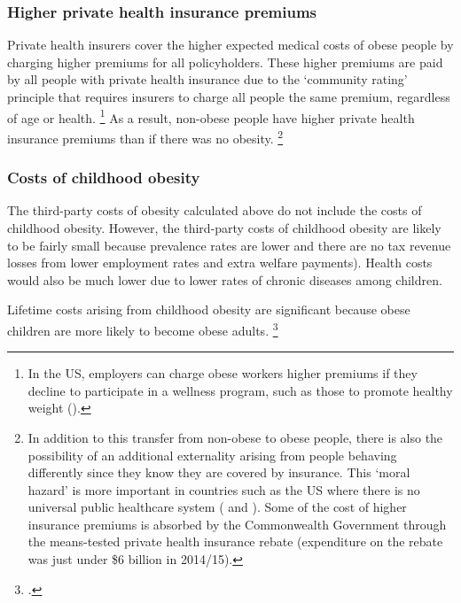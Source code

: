 \documentclass[embargoed]{grattan}
\begin{document}
\subsubsection{Higher private health insurance premiums}\label{higher-private-health-insurance-premiums}

Private health insurers cover the higher expected medical costs of obese people by charging higher premiums for all policyholders.
These higher premiums are paid by all people with private health insurance due to the `community rating' principle that requires insurers to charge all people the same premium, regardless of age or health.%
\footnote{In the US, employers can charge obese workers higher premiums if they decline to participate in a wellness program, such as those to promote healthy weight (\textcite{Karnani2016ObesityCrisisas}).} As a result, non-obese people have higher private health insurance premiums than if there was no obesity.%
\footnote{In addition to this transfer from non-obese to obese people, there is also the possibility of an additional externality arising from people behaving differently since they know they are covered by insurance.
This `moral hazard' is more important in countries such as the US where there is no universal public healthcare system (\textcite{Bhattacharya2011Whopaysobesity} and \textcite{Botkins2015DoesHealthInsurance}).
Some of the cost of higher insurance premiums is absorbed by the Commonwealth Government through the means-tested private health insurance rebate (expenditure on the rebate was just under \$6 billion in 2014/15).}

\subsubsection{Costs of childhood obesity}\label{costs-of-childhood-obesity}

The third-party costs of obesity calculated above do not include the costs of childhood obesity.
However, the third-party costs of childhood obesity are likely to be fairly small because prevalence rates are lower and there are no tax revenue losses from lower employment rates and extra welfare payments).
Health costs would also be much lower due to lower rates of chronic diseases among children.

Lifetime costs arising from childhood obesity are significant because obese children are more likely to become obese adults.%
\footcites{Health2013AustralianDietaryGuidelines}{Baker2007Childhoodbodymass}{Summerbell2005Interventionspreventingobesity}{Popkin2004nutritiontransitionworldwide}
\end{document}
